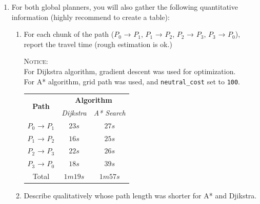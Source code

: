 \documentclass[12pt]{article}
\begin{document}
\begin{enumerate}
    \item For both global planners, you will also gather the following quantitative information (highly recommend to create a table):
    
    \begin{enumerate}
        
        \item For each chunk of the path ($P_0$ → $P_1$, $P_1$ → $P_2$, $P_2$ → $P_3$, $P_3$ → $P_0$), report the travel time (rough estimation is ok.)
        
        \textsc{Notice: }\\For Dijkstra algorithm, gradient descent was used for optimization.\\For A* algorithm, grid path was used, and \texttt{neutral_cost} set to \texttt{100}.
    
        \begin{table}[htb]
            \centering
            \begin{tabular}{|c|cc|}
            \hline
            \multirow{2}{*}{\textbf{Path}} & \multicolumn{2}{c|}{\textbf{Algorithm}}              \\ \cline{2-3} 
                                        & \multicolumn{1}{c|}{\textit{Dijkstra}} & \textit{A* Search} \\ \hline
            $P_0$ → $P_1$               & \multicolumn{1}{c|}{$23s$}                 & $27s$          \\ \hline
            $P_1$ → $P_2$               & \multicolumn{1}{c|}{$16s$}                 & $25s$          \\ \hline
            $P_2$ → $P_3$               & \multicolumn{1}{c|}{$22s$}                 & $26s$          \\ \hline
            $P_3$ → $P_0$               & \multicolumn{1}{c|}{$18s$}                 & $39s$          \\ \hline
            Total                       & \multicolumn{1}{c|}{$1m19s$}               & $1m57s$        \\ \hline
            \end{tabular}
            \end{table}
            \vspace{-5pt}
       
        \item Describe qualitatively whose path length was shorter for A* and Djikstra.
        

\end{enumerate}
\end{enumerate}
\end{document}
